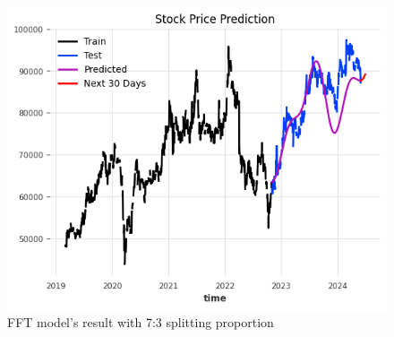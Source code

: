 \documentclass{ieeeojies}
\begin{document}
\begin{figure}[H]
  \centering
  \begin{minipage}{0.6\linewidth}
    \centering
    \includegraphics[width=\linewidth]{bibliography/diagram/FFT-VCB.png}
    \caption{FFT model’s result with 7:3 splitting proportion}
    \label{fig8}
  \end{minipage}
\end{figure}
\end{document}
